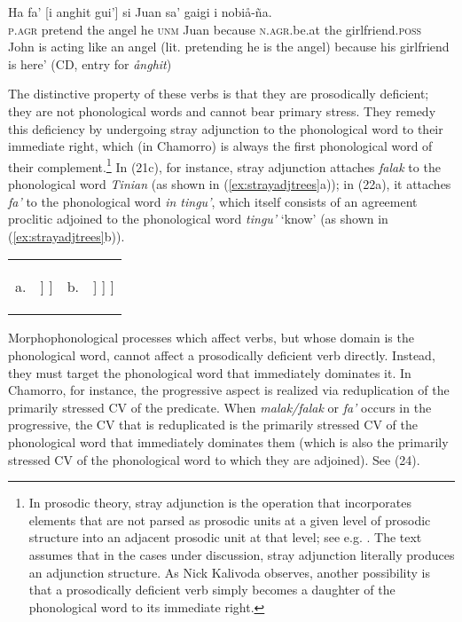 \documentclass[output=paper,
modfonts
]{LSP/langsci}
\begin{document}
\begin{exe}
\begin{xlist}
\ex \gll Ha fa' {[}i anghit gui'{]} si Juan sa' gaigi i nobiå-ña.\\
\textsc{p.agr} pretend the angel he \textsc{unm} Juan because
\textsc{n.agr.}be.at the girlfriend.\textsc{poss}\\
\glt John is acting like an angel (lit. pretending he is the angel) because
his girlfriend is here' (CD, entry for \emph{ånghit})
\z
\z

The distinctive property of these verbs is that they are prosodically
deficient; they are not phonological words and cannot bear primary
stress. They remedy this deficiency by undergoing stray adjunction to
the phonological word to their immediate right, which (in Chamorro) is
always the first phonological word of their complement.\footnote{In
  prosodic theory, stray adjunction is the operation that incorporates
  elements that are not parsed as prosodic units at a given level of
  prosodic structure into an adjacent prosodic unit at that level; see
  e.g. \citealt[13]{anderson2005}. The text assumes that in the cases under
  discussion, stray adjunction literally produces an adjunction
  structure. As Nick Kalivoda observes, another possibility is that a
  prosodically deficient verb simply becomes a daughter of the
  phonological word to its immediate right.} In (21c), for instance,
stray adjunction attaches \emph{falak} to the phonological word
\emph{Tinian} (as shown in (\ref{ex:strayadjtrees}a)); in (22a), it attaches \emph{fa'} to
the phonological word \emph{in tingu'}, which itself consists of an
agreement proclitic adjoined to the phonological word \emph{tingu'}
`know' (as shown in (\ref{ex:strayadjtrees}b)).

\ea
\begin{tabularx}{\linewidth-0.1em}[t]{lXlX}
	a. &
	\begin{forest}
		[ω
		[falak]
		[ω
		[Tinian]
		]
		]
	\end{forest} &
	b. &
	\begin{forest}
		[ω
		[fa']
		[ω
		[in]
		[ω
		[tingu']
		]
		]
		]
	\end{forest} \\	
\end{tabularx}\label{ex:strayadjtrees}
\z

Morphophonological processes which affect verbs, but whose domain is the
phonological word, cannot affect a prosodically deficient verb directly.
Instead, they must target the phonological word that immediately
dominates it. In Chamorro, for instance, the progressive aspect is
realized via reduplication of the primarily stressed CV of the
predicate. When \emph{malak/falak} or \emph{fa'} occurs in the
progressive, the CV that is reduplicated is the primarily stressed CV of
the phonological word that immediately dominates them (which is also the
primarily stressed CV of the phonological word to which they are
adjoined). See (24).


\end{xlist}
\end{exe}
\end{document}
